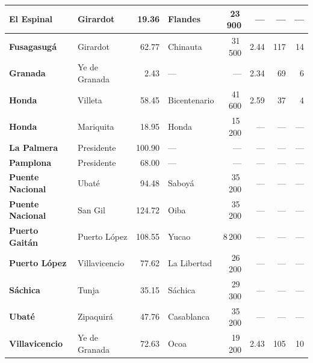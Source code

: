\begin{longtable}{|l|l|r|l|r|r|r|r|}
\hline
\textbf{El Espinal} & Girardot & 19.36 & Flandes & 23\,900 & --- & --- & --- \\
\hline
\textbf{Fusagasugá} & Girardot & 62.77 & Chinauta & 31\,500 & 2.44 & 117 & 14 \\
\hline
\textbf{Granada} & Ye de Granada & 2.43 & --- & --- & 2.34 & 69 & 6 \\
\hline
\textbf{Honda} & Villeta & 58.45 & Bicentenario & 41\,600 & 2.59 & 37 & 4 \\
\hline
\textbf{Honda} & Mariquita & 18.95 & Honda & 15\,200 & --- & --- & --- \\
\hline
\textbf{La Palmera} & Presidente & 100.90 & --- & --- & --- & --- & --- \\
\hline
\textbf{Pamplona} & Presidente & 68.00 & --- & --- & --- & --- & --- \\
\hline
\textbf{Puente Nacional} & Ubaté & 94.48 & Saboyá & 35\,200 & --- & --- & --- \\
\hline
\textbf{Puente Nacional} & San Gil & 124.72 & Oiba & 35\,200 & --- & --- & --- \\
\hline
\textbf{Puerto Gaitán} & Puerto López & 108.55 & Yucao & 8\,200 & --- & --- & --- \\
\hline
\textbf{Puerto López} & Villavicencio & 77.62 & La Libertad & 26\,200 & --- & --- & --- \\
\hline
\textbf{Sáchica} & Tunja & 35.15 & Sáchica & 29\,300 & --- & --- & --- \\
\hline
\textbf{Ubaté} & Zipaquirá & 47.76 & Casablanca & 35\,200 & --- & --- & --- \\
\hline
\textbf{Villavicencio} & Ye de Granada & 72.63 & Ocoa & 19\,200 & 2.43 & 105 & 10 \\
\hline
\end{longtable}
